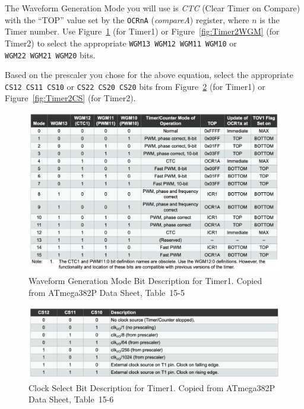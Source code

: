The Waveform Generation Mode you will use is \textit{CTC} (Clear Timer on
Compare) with the ``TOP'' value set by the \texttt{OCRnA} (\textit{compareA})
register, where $n$ is the Timer number. Use Figure~\ref{fig:Timer1WGM} (for
Timer1) or Figure~\ref{fig:Timer2WGM} (for Timer2) to select the appropriate
\texttt{WGM13}~\texttt{WGM12}~\texttt{WGM11}~\texttt{WGM10} or
\texttt{WGM22}~\texttt{WGM21}~\texttt{WGM20} bits.

Based on the prescaler you chose for the above equation, select the appropriate
\texttt{CS12}~\texttt{CS11}~\texttt{CS10} or
\texttt{CS22}~\texttt{CS20}~\texttt{CS20} bits from Figure~\ref{fig:Timer1CS}
(for Timer1) or Figure~\ref{fig:Timer2CS} (for Timer2).

\begin{figure}[p]
    \centering
    \includegraphics[width=15cm]{WGM-Timer1}
    \caption{Waveform Generation Mode Bit Description for Timer1. \tiny Copied from ATmega382P Data Sheet, Table~15-5 \label{fig:Timer1WGM}}
\end{figure}

\begin{figure}[p]
    \centering
    \includegraphics[width=15cm]{CS-Timer1}
    \caption{Clock Select Bit Description for Timer1. \tiny Copied from ATmega382P Data Sheet, Table~15-6 \label{fig:Timer1CS}}
\end{figure}

